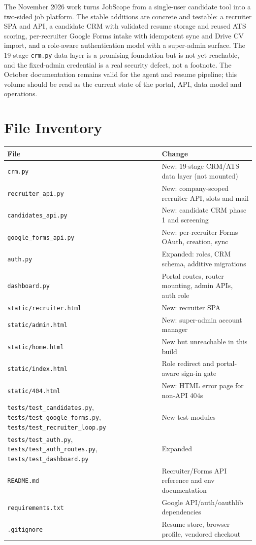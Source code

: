 \documentclass[11pt,a4paper]{article}
\newcommand{\file}[1]{\texttt{\small #1}}
\begin{document}
The November 2026 work turns JobScope from a single-user candidate tool into a
two-sided job platform. The stable additions are concrete and testable: a
recruiter SPA and API, a candidate CRM with validated resume storage and reused
ATS scoring, per-recruiter Google Forms intake with idempotent sync and Drive
CV import, and a role-aware authentication model with a super-admin surface.
The 19-stage \file{crm.py} data layer is a promising foundation but is not yet
reachable, and the fixed-admin credential is a real security defect, not a
footnote. The October documentation remains valid for the agent and resume
pipeline; this volume should be read as the current state of the portal, API,
data model and operations.

\appendix

\section{File Inventory}
\label{u:files}

\begin{center}
\begin{tabular}{@{}lp{10.8cm}@{}}
\toprule
\textbf{File} & \textbf{Change}\\
\midrule
\file{crm.py} & New: 19-stage CRM/ATS data layer (not mounted)\\
\file{recruiter\_api.py} & New: company-scoped recruiter API, slots and mail\\
\file{candidates\_api.py} & New: candidate CRM phase 1 and screening\\
\file{google\_forms\_api.py} & New: per-recruiter Forms OAuth, creation, sync\\
\file{auth.py} & Expanded: roles, CRM schema, additive migrations\\
\file{dashboard.py} & Portal routes, router mounting, admin APIs, auth role\\
\file{static/recruiter.html} & New: recruiter SPA\\
\file{static/admin.html} & New: super-admin account manager\\
\file{static/home.html} & New but unreachable in this build\\
\file{static/index.html} & Role redirect and portal-aware sign-in gate\\
\file{static/404.html} & New: HTML error page for non-API 404s\\
\file{tests/test\_candidates.py}, \file{tests/test\_google\_forms.py},
\file{tests/test\_recruiter\_loop.py} & New test modules\\
\file{tests/test\_auth.py}, \file{tests/test\_auth\_routes.py},
\file{tests/test\_dashboard.py} & Expanded\\
\file{README.md} & Recruiter/Forms API reference and env documentation\\
\file{requirements.txt} & Google API/auth/oauthlib dependencies\\
\file{.gitignore} & Resume store, browser profile, vendored checkout\\
\bottomrule
\end{tabular}
\end{center}
\end{document}
